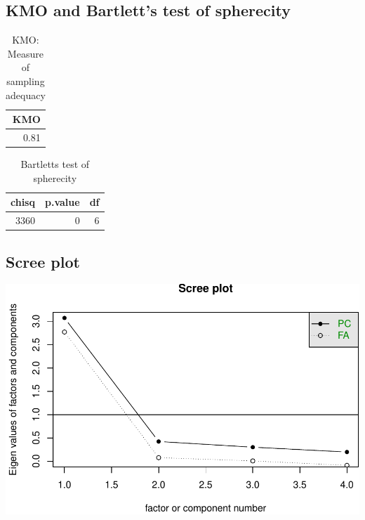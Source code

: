 \documentclass[]{article}
\begin{document}
\hypertarget{kmo-and-bartletts-test-of-spherecity-5}{%
\subsection{KMO and Bartlett's test of
spherecity}\label{kmo-and-bartletts-test-of-spherecity-5}}

\begin{table}[H]

\caption{\label{tab:unnamed-chunk-29}KMO: Measure of sampling adequacy}
\centering
\fontsize{6}{8}\selectfont
\begin{tabular}[t]{r}
\toprule
KMO\\
\midrule
0.81\\
\bottomrule
\end{tabular}
\end{table}

\begin{table}[H]

\caption{\label{tab:unnamed-chunk-29}Bartletts test of spherecity}
\centering
\fontsize{6}{8}\selectfont
\begin{tabular}[t]{rrr}
\toprule
chisq & p.value & df\\
\midrule
3360 & 0 & 6\\
\bottomrule
\end{tabular}
\end{table}

\hypertarget{scree-plot-5}{%
\subsection{Scree plot}\label{scree-plot-5}}

\includegraphics{PCA_covid_files/figure-latex/unnamed-chunk-30-1.pdf}
\end{document}
